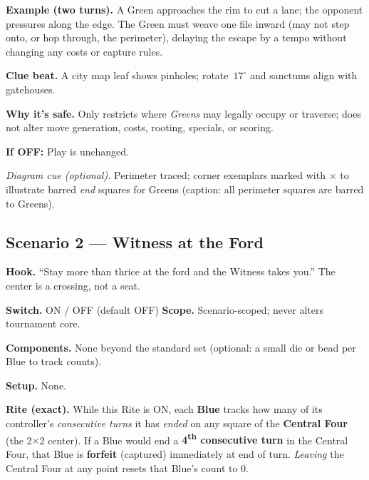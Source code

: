 \documentclass[11pt]{article}
\numberwithin{equation}{section} %
\theoremstyle{plain} %
\theoremstyle{definition} %
\theoremstyle{remark} %
\begin{document}
\medskip
\noindent\textbf{Example (two turns).}  
A Green approaches the rim to cut a lane; the opponent pressures along the edge. The Green must weave one file inward (may not step onto, or hop through, the perimeter), delaying the escape by a tempo without changing any costs or capture rules.

\medskip
\noindent\textbf{Clue beat.} A city map leaf shows pinholes; rotate \(\,17^\circ\) and sanctums align with gatehouses.

\medskip
\noindent\textbf{Why it’s safe.} Only restricts where \emph{Greens} may legally occupy or traverse; does not alter move generation, costs, rooting, specials, or scoring.

\medskip
\noindent\textbf{If \textsc{OFF}:} Play is unchanged.

\medskip
\noindent\textit{Diagram cue (optional).} Perimeter traced; corner exemplars marked with \(\times\) to illustrate barred \emph{end} squares for Greens (caption: all perimeter squares are barred to Greens).

\subsection{Scenario 2 — Witness at the Ford}
\label{scen:witness-ford}

\noindent\textbf{Hook.} “Stay more than thrice at the ford and the Witness takes you.” The center is a crossing, not a seat.

\medskip
\noindent\textbf{Switch.} \textsc{ON / OFF} (default \textsc{OFF}) \hfill \textbf{Scope.} Scenario-scoped; never alters tournament core.

\medskip
\noindent\textbf{Components.} None beyond the standard set (optional: a small die or bead per Blue to track counts).

\medskip
\noindent\textbf{Setup.} None.

\medskip
\noindent\textbf{Rite (exact).} While this Rite is \textsc{ON}, each \textbf{Blue} tracks how many of its controller’s \emph{consecutive turns} it has \emph{ended} on any square of the \textbf{Central Four} (the 2\(\times\)2 center). If a Blue would end a \textbf{4\textsuperscript{th} consecutive turn} in the Central Four, that Blue is \textbf{forfeit} (captured) immediately at end of turn. \emph{Leaving} the Central Four at any point resets that Blue’s count to 0.
\end{document}
